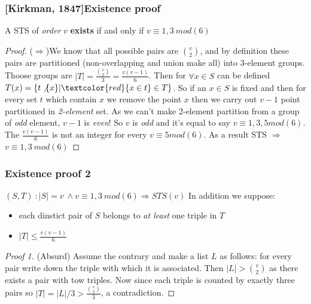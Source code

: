\begin{frame}
	\frametitle{[Kirkman, 1847]Existence proof}
	\begin{theorem}
		A STS of \textit{order} $v$ \textbf{exists} if and only if $v\equiv 1,3\ mod(6)$  
	\end{theorem}
	\begin{proof}
		($\Rightarrow$)We know that all possible pairs are $\binom{v}{2}$, and by definition these pairs are partitioned (non-overlapping and union make all) into 3-element groups. Thoose groups are $|T|=\frac{\binom{v}{2}}{3}=\frac{v(v-1)}{6}$. Then for $\forall x \in S$ can be defined $T(x) = \{ t\not\{x\} | \textcolor{red}{x \in t} \in T \}$. So if an $x \in S$ is fixed and then for every set $t$ which contain $x$ we remove the point $x$ then we carry out $v-1$ point partitioned in \textit{2-element} set. As we can't make 2-element partition from a group of \textit{odd} element, $v-1$ is \textit{even}! So $v$ is \textit{odd} and it's equal to say $v \equiv 1,3,5 mod(6)$. The $\frac{v(v-1)}{6}$ is not an integer for every $v \equiv 5 mod(6)$. As a result STS $\Rightarrow$ $v\equiv 1,3\ mod(6)$
	\end{proof}
\end{frame}

\begin{frame}
\frametitle{Existence proof 2}
\begin{block}{$(S,T)\ : |S|=v\ \wedge v\equiv 1,3\ mod(6) \Rightarrow STS(v)$}
	In addition we suppose:
	\begin{itemize}
		\item each dinstict pair of $S$ belongs to \textit{at least} one triple in $T$
		\item $|T| \le \frac{v(v-1)}{6}$
	\end{itemize}
\end{block}
\begin{proof}[Proof 1]
	(Absurd) Assume the contrary and make a list $L$ as follows: for every pair write down the triple with which it is associated. Then $|L|> \binom{v}{2}$ as there exists a pair with tow triples. Now since each triple is counted by exactly three pairs so $|T| =|L|/3 > \frac{\binom{v}{2}}{3}$, a contradiction.
\end{proof}


\end{frame}

